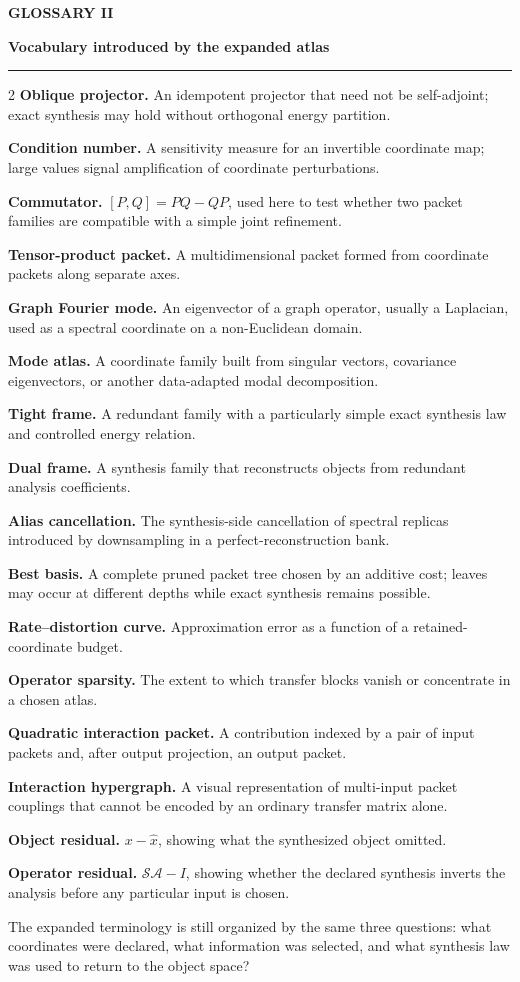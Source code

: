 \documentclass[10pt]{article}
\newcommand{\PageTitle}[2][]{%
  {\color{Muted}\fontsize{9.5}{11}\selectfont\bfseries #1}\par
  \vspace{0.02in}
  {\color{Ink}\fontsize{20}{23}\selectfont\bfseries #2}\par
  \vspace{0.07in}
  {\color{Blue}\rule{\linewidth}{1.15pt}}\par
  \vspace{0.08in}
}
\newcommand{\Callout}[2][PaleBlue]{%
  \noindent\colorbox{#1}{\parbox{0.965\linewidth}{\vspace{2pt}\small\RaggedRight #2\par\vspace{2pt}}}
}
\begin{document}
\clearpage
\PageTitle[GLOSSARY II]{Vocabulary introduced by the expanded atlas}
\begin{multicols}{2}
\textbf{Oblique projector.} An idempotent projector that need not be self-adjoint; exact synthesis may hold without orthogonal energy partition.\par
\textbf{Condition number.} A sensitivity measure for an invertible coordinate map; large values signal amplification of coordinate perturbations.\par
\textbf{Commutator.} $[P,Q]=PQ-QP$, used here to test whether two packet families are compatible with a simple joint refinement.\par
\textbf{Tensor-product packet.} A multidimensional packet formed from coordinate packets along separate axes.\par
\textbf{Graph Fourier mode.} An eigenvector of a graph operator, usually a Laplacian, used as a spectral coordinate on a non-Euclidean domain.\par
\textbf{Mode atlas.} A coordinate family built from singular vectors, covariance eigenvectors, or another data-adapted modal decomposition.\par
\textbf{Tight frame.} A redundant family with a particularly simple exact synthesis law and controlled energy relation.\par
\textbf{Dual frame.} A synthesis family that reconstructs objects from redundant analysis coefficients.\par
\columnbreak
\textbf{Alias cancellation.} The synthesis-side cancellation of spectral replicas introduced by downsampling in a perfect-reconstruction bank.\par
\textbf{Best basis.} A complete pruned packet tree chosen by an additive cost; leaves may occur at different depths while exact synthesis remains possible.\par
\textbf{Rate--distortion curve.} Approximation error as a function of a retained-coordinate budget.\par
\textbf{Operator sparsity.} The extent to which transfer blocks vanish or concentrate in a chosen atlas.\par
\textbf{Quadratic interaction packet.} A contribution indexed by a pair of input packets and, after output projection, an output packet.\par
\textbf{Interaction hypergraph.} A visual representation of multi-input packet couplings that cannot be encoded by an ordinary transfer matrix alone.\par
\textbf{Object residual.} $x-\widehat x$, showing what the synthesized object omitted.\par
\textbf{Operator residual.} $\mathcal S\mathcal A-I$, showing whether the declared synthesis inverts the analysis before any particular input is chosen.\par
\end{multicols}
\vfill
\Callout[PaleTeal]{The expanded terminology is still organized by the same three questions: what coordinates were declared, what information was selected, and what synthesis law was used to return to the object space?}
\end{document}
